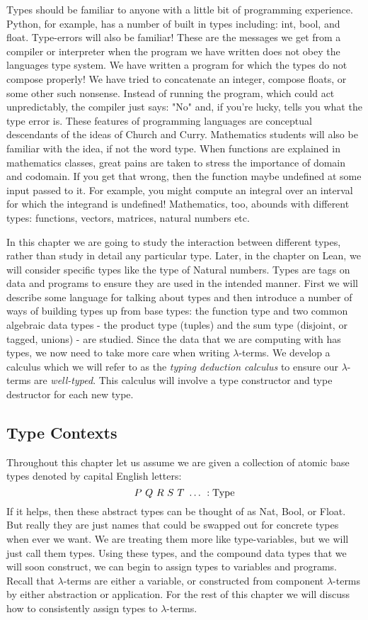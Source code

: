 \documentclass{book}
\begin{document}
    Types should be familiar to anyone with a little bit of programming experience. Python, for example, has a number of built in types including: int, bool, and float. Type-errors will also be familiar! These are the messages we get from a compiler or interpreter when the program we have written does not obey the languages type system. We have written a program for which the types do not compose properly! We have tried to concatenate an integer, compose floats, or some other such nonsense. Instead of running the program, which could act unpredictably, the compiler just says: "No" and, if you're lucky, tells you what the type error is. These features of programming languages are conceptual descendants of the ideas of Church and Curry. Mathematics students will also be familiar with the idea, if not the word type. When functions are explained in mathematics classes, great pains are taken to stress the importance of domain and codomain. If you get that wrong, then the function maybe undefined at some input passed to it. For example, you might compute an integral over an interval for which the integrand is undefined! Mathematics, too, abounds with different types: functions, vectors, matrices, natural numbers etc. 

    In this chapter we are going to study the interaction between different types, rather than study in detail any particular type. Later, in the chapter on Lean, we will consider specific types like the type of Natural numbers. Types are tags on data and programs to ensure they are used in the intended manner. First we will describe some language for talking about types and then introduce a number of ways of building types up from base types: the function type and two common algebraic data types - the product type (tuples) and the sum type (disjoint, or tagged, unions) - are studied. Since the data that we are computing with has types, we now need to take more care when writing $\lambda$-terms. We develop a calculus which we will refer to as the \emph{typing deduction calculus} to ensure our $\lambda$-terms are \emph{well-typed}. This calculus will involve a type constructor and type destructor for each new type. 

    \newpage
    \subsection*{Type Contexts}

    Throughout this chapter let us assume we are given a collection of atomic base types denoted by capital English letters: $$P \ Q \ R \ S \ T \ \dots \ : \text{Type} $$ If it helps, then these abstract types can be thought of as Nat, Bool, or Float. But really they are just names that could be swapped out for concrete types when ever we want. We are treating them more like type-variables, but we will just call them types. Using these types, and the compound data types that we will soon construct, we can begin to assign types to variables and programs. Recall that $\lambda$-terms are either a variable, or constructed from component $\lambda$-terms by either abstraction or application. For the rest of this chapter we will discuss how to consistently assign types to $\lambda$-terms. 
\end{document}
